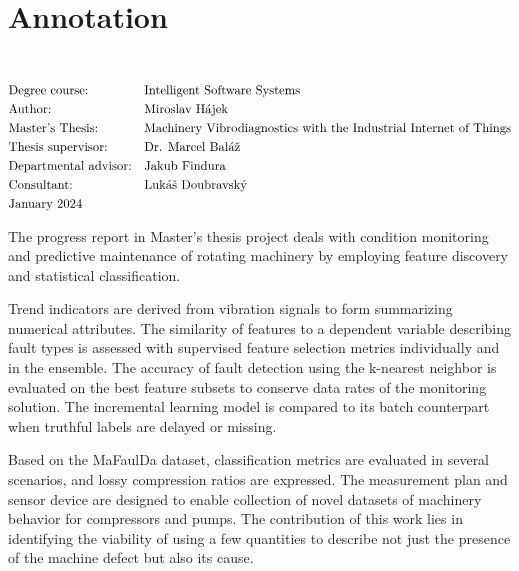 \thispagestyle{empty}
\section*{Annotation}
\UniversityEN \\
\uppercase{\FacultyEN}
\vspace{-8pt}
{\setlength{\mathindent}{0cm}
\begin{align*}
&\text{Degree course:} && \text{\StudyProgrammeEN} \\
&\text{Author:} && \text{\AuthorEN} \\
&\text{\ThesisEN:} && \text{\TitleEN} \\
&\text{Thesis supervisor:} && \text{\SupervisorEN} \\
&\text{Departmental advisor:} && \text{\DepartmentalAdvisorEN} \\
&\text{Consultant:} && \text{\ConsultantEN} \\
&\text{\DateEN}
\end{align*}}

The progress report in Master's thesis project  deals with condition monitoring and predictive maintenance of rotating machinery by employing feature discovery and statistical classification. 

Trend indicators are derived from vibration signals to form summarizing numerical attributes. The similarity of features to a dependent variable describing fault types is assessed with supervised feature selection metrics individually and in the ensemble. The accuracy of fault detection using the k-nearest neighbor is evaluated on the best feature subsets to conserve data rates of the monitoring solution. The incremental learning model is compared to its batch counterpart when truthful labels are delayed or missing. 

Based on the MaFaulDa dataset, classification metrics are evaluated in several scenarios, and lossy compression ratios are expressed. The measurement plan and sensor device are designed to enable collection of novel datasets of machinery behavior for compressors and pumps. The contribution of this work lies in identifying the viability of using a few quantities to describe not just the presence of the machine defect but also its cause.
\emptypage 

\thispagestyle{empty}

